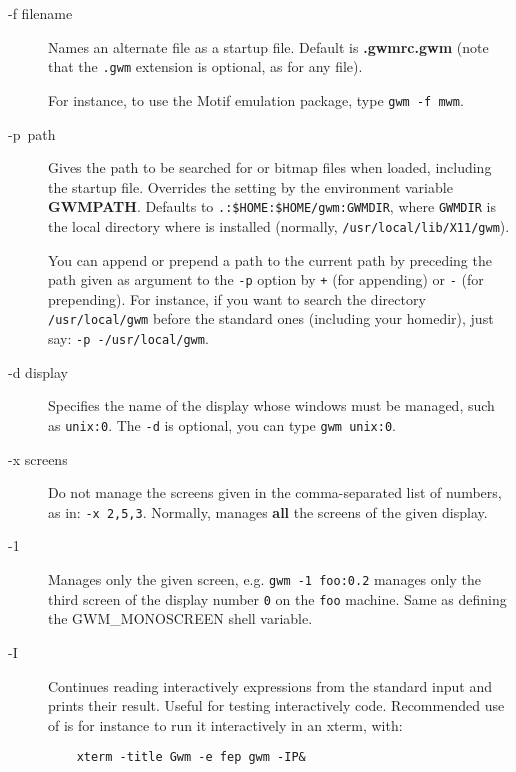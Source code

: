 \begin{description}

\item[-f filename] Names an alternate file as a {\GWM} startup file.
Default is {\bf .gwmrc.gwm} (note that the \verb".gwm" extension is
optional, as for any {\WOOL} file).\sloppy 

For instance, to use the {\sc Motif} emulation package, type
\verb"gwm -f mwm".

\item[-p~path] \label{GWMPATH}Gives the path to be searched for {\WOOL} or bitmap
files when loaded, including the startup file. Overrides the setting by the
environment variable {\bf GWMPATH}.  Defaults to \linebreak
\verb".:$HOME:$HOME/gwm:GWMDIR", where {\tt GWMDIR} is the local directory
where {\GWM} is installed (normally, {\tt /usr/local/lib/X11/gwm}).

You can append or prepend a path to the current path by preceding the path
given as argument to the \verb"-p" option by \verb"+" (for appending) or
\verb"-" (for prepending). For instance, if you want to search the directory
\verb"/usr/local/gwm" before the standard ones (including your homedir),
just say: \verb"-p -/usr/local/gwm".

\item[-d display] Specifies the name of the display whose windows must be
managed, such as \verb"unix:0". The \verb"-d" is optional, you can type
\verb"gwm unix:0".

\item[-x screens] Do not manage the screens given in the comma-separated
list of numbers, as in: {\tt -x 2,5,3}. Normally, {\GWM} manages {\bf all}
the screens of the given display.

\item[-1] Manages only the given screen, e.g. \verb"gwm -1 foo:0.2" manages
only the third screen of the display number \verb"0" on the \verb"foo"
machine. Same as defining the GWM\_MONOSCREEN shell variable.

\item[-I] Continues reading interactively {\WOOL} expressions from the
standard input and prints their result. Useful for testing interactively code.
Recommended use of {\GWM} is for instance to run it interactively in an xterm,
with:
\begin{verbatim} 
    xterm -title Gwm -e fep gwm -IP&
\end{verbatim}	


\end{description}
